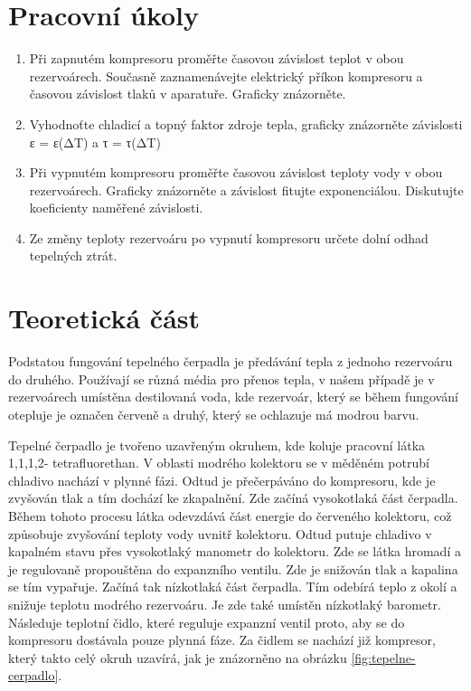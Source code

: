 \section{Pracovní úkoly}

\begin{enumerate}
\item Při zapnutém kompresoru proměřte časovou závislost teplot v obou rezervoárech. Současně zaznamenávejte elektrický příkon kompresoru a časovou závislost tlaků v aparatuře. Graficky znázorněte.

\item Vyhodnoťte chladicí a topný faktor zdroje tepla, graficky znázorněte závislosti ε = ε(ΔT) a τ = τ(ΔT)

\item Při vypnutém kompresoru proměřte časovou závislost teploty vody v obou rezervoárech. Graficky znázorněte a závislost fitujte exponenciálou. Diskutujte koeficienty naměřené závislosti.

\item Ze změny teploty rezervoáru po vypnutí kompresoru určete dolní odhad tepelných ztrát.

\end{enumerate}

\section{Teoretická část}

Podstatou fungování tepelného čerpadla je předávání tepla z jednoho rezervoáru do druhého. Používají se různá média pro přenos tepla, v našem případě je v rezervoárech umístěna destilovaná voda, kde rezervoár, který se během fungování otepluje je označen červeně a druhý, který se ochlazuje má modrou barvu.

Tepelné čerpadlo je tvořeno uzavřeným okruhem, kde koluje pracovní látka 1,1,1,2-
tetrafluorethan. V oblasti modrého kolektoru se v měděném potrubí chladivo nachází v plynné fázi. Odtud je přečerpáváno do kompresoru, kde je zvyšován tlak a tím dochází ke zkapalnění. Zde začíná vysokotlaká část čerpadla. Během tohoto procesu látka odevzdává část energie do červeného kolektoru, což způsobuje zvyšování teploty vody uvnitř kolektoru. Odtud putuje chladivo v kapalném stavu přes vysokotlaký manometr do kolektoru. Zde se látka hromadí a je regulovaně propouštěna do expanzního ventilu. Zde je snižován tlak a kapalina se tím vypařuje. Začíná tak nízkotlaká část čerpadla. Tím odebírá teplo z okolí a snižuje teplotu modrého rezervoáru. Je zde také umístěn nízkotlaký barometr. Následuje teplotní čidlo, které reguluje expanzní ventil proto, aby se do kompresoru dostávala pouze plynná fáze. Za čidlem se nachází již kompresor, který takto celý okruh uzavírá, jak je znázorněno na obrázku \ref{fig:tepelne-cerpadlo}.


